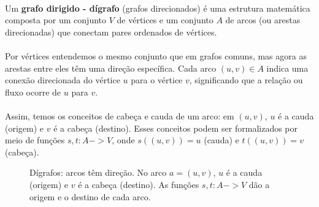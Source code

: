 \documentclass[12pt,a4paper]{article}
\def\emph#1{#1}%
\def\to{->}%
\begin{document}
\paragraph{}
Um \textbf{grafo dirigido - dígrafo} (grafos direcionados) é uma estrutura matemática composta por um conjunto \(V\) de \emph{vértices} e um conjunto \(A\) de \emph{arcos} (ou \emph{arestas direcionadas}) que conectam pares ordenados de vértices.

\paragraph{}
Por vértices entendemos o mesmo conjunto que em grafos comuns, mas agora as arestas entre eles têm uma direção específica. Cada arco \((u, v) \in A\) indica uma conexão direcionada do vértice \(u\) para o vértice \(v\), significando que a relação ou fluxo ocorre de \(u\) para \(v\).

\paragraph{}
Assim, temos os conceitos de cabeça e cauda de um arco: em \((u, v)\), \(u\) é a \emph{cauda} (origem) e \(v\) é a \emph{cabeça} (destino). Esses conceitos podem ser formalizados por meio de funções \(s, t: A \to V\), onde \(s((u, v)) = u\) (cauda) e \(t((u, v)) = v\) (cabeça).

\begin{figure}[H]
\centering
{}
\caption{Dígrafos: arcos têm direção. No arco $a=(u,v)$, $u$ é a \emph{cauda} (origem) e $v$ é a \emph{cabeça} (destino). As funções $s,t:A\to V$ dão a origem e o destino de cada arco.}
\label{fig:def-digrafo}
\end{figure}
\end{document}
